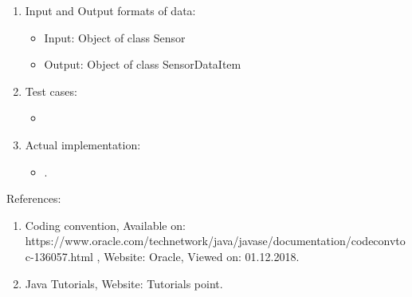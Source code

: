 \documentclass{article}
\begin{document}
\begin{enumerate}
\begin{itemize}
    \\

    Class name: SensorDataItem
    This class holds the data with respect to each object available in each modality image.
    The data is available as three variables of a class.For instance,\\
    
    (knife,1, 99\%)
    
\end{itemize}

\item Input and Output formats of data:
\begin{itemize}
    \item Input: Object of class Sensor
    \item Output: Object of class SensorDataItem
\end{itemize}

\item Test cases:
\begin{itemize}
    \item 
\end{itemize}


\item  Actual implementation:
\begin{itemize}
    \item .
\end{itemize}

\end{enumerate}


References:
\begin{enumerate}
    \item Coding convention, Available on: https://www.oracle.com/technetwork/java/javase/documentation/codeconvtoc-136057.html , Website: Oracle, Viewed on: 01.12.2018.
    \item Java Tutorials, Website: Tutorials point.
\end{enumerate}
\end{document}
